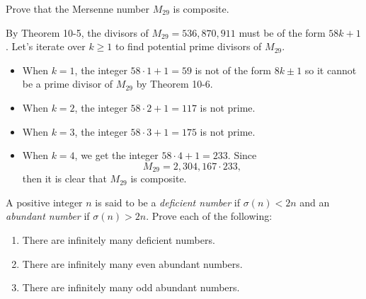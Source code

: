 \begin{exercise}
    Prove that the Mersenne number $M_{29}$ is composite. \\
\end{exercise}

\begin{solution}
    By Theorem 10-5, the divisors of $M_{29} = 536,870,911$ must be of the form $58k+1$. Let's iterate over $k \geq 1$ to find potential prime divisors of $M_{29}$.
    \begin{itemize}
        \item When $k = 1$, the integer $58\cdot 1 + 1 = 59$ is not of the form $8k \pm 1$ so it cannot be a prime divisor of $M_{29}$ by Theorem 10-6.
        \item When $k = 2$, the integer $58\cdot 2 + 1 = 117$ is not prime.
        \item When $k = 3$, the integer $58\cdot 3 + 1 = 175$ is not prime.
        \item When $k = 4$, we get the integer $58\cdot 4 + 1 = 233$. Since
        $$M_{29} = 2,304,167\cdot 233,$$
        then it is clear that $M_{29}$ is composite. \\
    \end{itemize}
\end{solution}

\begin{exercise}
    A positive integer $n$ is said to be a \textit{deficient number} if $\sigma(n) < 2n$ and an \textit{abundant number} if $\sigma(n) > 2n$. Prove each of the following:
    \begin{enumerate}
        \item There are infinitely many deficient numbers. 
        \item There are infinitely many even abundant numbers. 
        \item There are infinitely many odd abundant numbers.  \\
    \end{enumerate}
\end{exercise}

